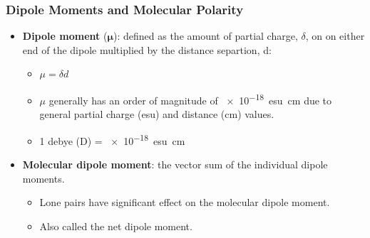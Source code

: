 \documentclass[12pt,a4paper]{article}
\begin{document}
\begin{itemize}
    \subsubsection{Dipole Moments and Molecular Polarity}
    \begin{itemize}
        \item \textbf{Dipole moment} ($\bm{\mu}$): defined as the amount of partial charge, $\delta$, on on either end of the dipole multiplied by the distance separtion, d:
             \begin{itemize}
                \item {\color{o-Sun}\(\mu=\delta d\)}
                \item $\mu$ generally has an order of magnitude of {\color{o-Sun}\SI{e-18}{esu.cm}} due to general partial charge (esu) and distance (cm) values.
                \item 1 {\color{o-Sun}debye (D)} = \SI{e-18}{esu.cm} 
             \end{itemize}
          \item \textbf{Molecular dipole moment}: the vector sum of the individual dipole moments.
              \begin{itemize}
                 \item Lone pairs have significant effect on the molecular dipole moment.
                 \item Also called the net dipole moment.
            \end{itemize}
    \end{itemize}
\end{itemize}
\end{document}
